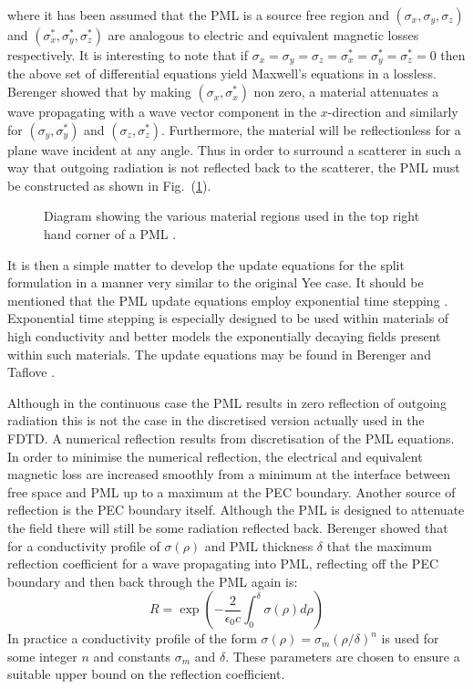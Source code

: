 \documentclass[a4paper, 12pt]{article}
\newcommand{\rfig}[1]{Fig.\ (\ref{#1})}
\begin{document}
	where it has been assumed that the PML is a source free region and
	$(\sigma_x,\sigma_y,\sigma_z)$ and $(\sigma_x^*,\sigma_y^*,\sigma_z^*)$ are
	analogous to electric and equivalent magnetic losses respectively. It is interesting
	to note that if
	$\sigma_x=\sigma_y=\sigma_z=\sigma_x^*=\sigma_y^*=\sigma_z^*=0$ then
	the above set of differential equations yield Maxwell's
	equations in a lossless. Berenger showed that by making $(\sigma_x,\sigma_x^*)$ non
	zero, a material attenuates a wave propagating with a wave vector component in the
	$x$-direction and similarly for $(\sigma_y,\sigma_y^*)$ and
	$(\sigma_z,\sigma_z^*)$. Furthermore, the material will be
	reflectionless for a plane wave incident at any angle. Thus in order
	to surround a scatterer in such a way that outgoing radiation is not
	reflected back to the scatterer, the PML must be constructed as shown
	in \rfig{fig:fdtd:pml}.
	\begin{figure}[!h]
		\centering
		\caption{Diagram showing the various material regions used in the
			top right hand corner of a PML \cite{berenger96journalcopmphys363}.}
		\label{fig:fdtd:pml}
	\end{figure}
	It is then a simple matter to develop the update equations for the
	split formulation in a manner very similar to the original Yee
	case. It should be mentioned that the PML update equations employ
	exponential time stepping
	\cite{holland94ieeetranseleccompat32}. Exponential time stepping is
	especially designed to be used within materials of high conductivity
	and better models the exponentially decaying fields present within
	such materials. The update equations may be found in Berenger
	\cite{berenger96journalcopmphys363} and Taflove \cite{taflove00book}. 
	
	Although in the continuous case the PML results in zero reflection of
	outgoing radiation this is not the case in the discretised version
	actually used in the FDTD. A numerical
	reflection results from discretisation of the PML equations. In order
	to minimise the numerical reflection, the electrical and equivalent
	magnetic loss are increased smoothly from a minimum at the interface
	between free space and PML up to a maximum at the PEC
	boundary. Another source of reflection is the PEC boundary
	itself. Although the PML is designed to attenuate the field there will
	still be some radiation reflected back. Berenger showed that for a conductivity profile of
	$\sigma(\rho)$ and PML thickness $\delta$ that the maximum reflection
	coefficient for a wave propagating into PML, reflecting off the PEC
	boundary and then back through the PML again is:
	\begin{equation}
		\label{eq:fdtd:pmlref}
		R = \exp\left(-\frac{2}{\epsilon_0c}\int_0^\delta\sigma(\rho)d\rho\right)
	\end{equation}
	In practice a conductivity profile of the form \cite{taflove95cetfdtdm}
	$\sigma(\rho)=\sigma_m(\rho/\delta)^n$ is used for some integer $n$
	and constants $\sigma_m$ and $\delta$. These parameters are chosen to
	ensure a suitable upper bound on the reflection coefficient.
	
\end{document}
